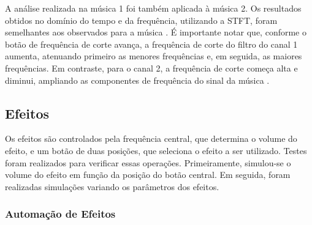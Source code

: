 A análise realizada na música 1 %
foi também aplicada à música 2. %
Os resultados obtidos no domínio do tempo e da frequência, utilizando a STFT, foram semelhantes aos observados para a música \cite{track01}. É importante notar que, conforme o botão de frequência de corte avança, a frequência de corte do filtro do canal 1 aumenta, atenuando primeiro as menores frequências e, em seguida, as maiores frequências. Em contraste, para o canal 2, a frequência de corte começa alta e diminui, ampliando as componentes de frequência do sinal da música \cite{track02}.

\subsection{Efeitos}

Os efeitos são controlados pela frequência central, que determina o volume do efeito, e um botão de duas posições, que seleciona o efeito a ser utilizado. Testes foram realizados para verificar essas operações.
Primeiramente, simulou-se o volume do efeito em função da posição do botão central. Em seguida, foram realizadas simulações variando os parâmetros dos efeitos.

\subsubsection*{Automação de Efeitos}

